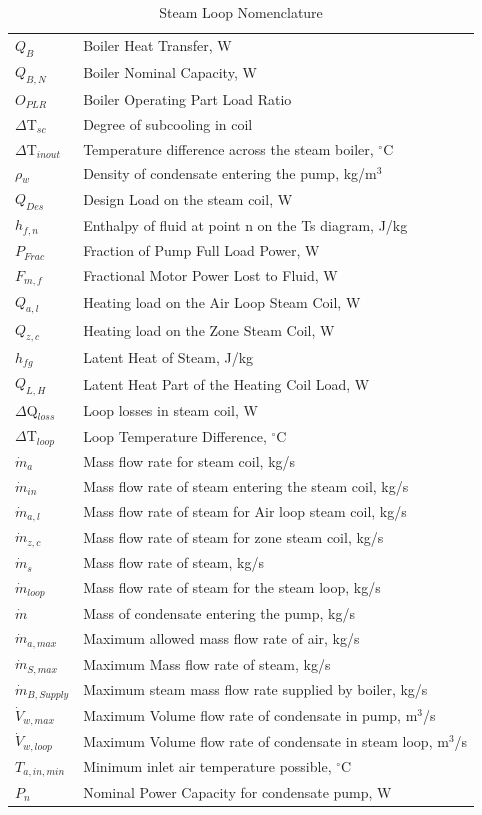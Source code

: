 \begin{longtable}[c]{p{1.0in}p{4.0in}}
\caption{Steam Loop Nomenclature \label{table:steam-loop-nomenclature}} \tabularnewline
\toprule
\endfirsthead

\caption[]{Steam Loop Nomenclature} \tabularnewline
\toprule
\endhead

\({Q_{B}}\) & Boiler Heat Transfer, W \tabularnewline
\({Q_{B,N}}\) & Boiler Nominal Capacity, W \tabularnewline
\({O_{PLR}}\) & Boiler Operating Part Load Ratio \tabularnewline
\(\Delta\)T\(_{sc}\) & Degree of subcooling in coil \tabularnewline
\(\Delta\)T\(_{inout}\) & Temperature difference across the steam boiler, \(^{\circ}\)C \tabularnewline
\(\rho\)\(_{w}\) & Density of condensate entering the pump, kg/m\(^3\) \tabularnewline
\(Q_{Des}\) & Design Load on the steam coil, W \tabularnewline
\(h_{f,n}\) & Enthalpy of fluid at point n on the Ts diagram, J/kg \tabularnewline
\(P_{Frac}\) & Fraction of Pump Full Load Power, W \tabularnewline
\(F_{m,f}\) & Fractional Motor Power Lost to Fluid, W \tabularnewline
\(Q_{a,l}\) & Heating load on the Air Loop Steam Coil, W \tabularnewline
\(Q_{z,c}\) & Heating load on the Zone Steam Coil, W \tabularnewline
\(h_{fg}\) & Latent Heat of Steam, J/kg \tabularnewline
\(Q_{L,H}\) & Latent Heat Part of the Heating Coil Load, W \tabularnewline
\(\Delta\)Q\(_{loss}\) & Loop losses in steam coil, W \tabularnewline
\(\Delta\)T\(_{loop}\) & Loop Temperature Difference, \(^{\circ}\)C \tabularnewline
\(\dot m_{a}\) & Mass flow rate for steam coil, kg/s \tabularnewline
\(\dot m_{in}\) & Mass flow rate of steam entering the steam coil, kg/s \tabularnewline
\(\dot m_{a,l}\) & Mass flow rate of steam for Air loop steam coil, kg/s \tabularnewline
\(\dot m_{z,c}\) & Mass flow rate of steam for zone steam coil, kg/s \tabularnewline
\(\dot m_{s}\) & Mass flow rate of steam, kg/s \tabularnewline
\(\dot m_{loop}\) & Mass flow rate of steam for the steam loop, kg/s \tabularnewline
\(\dot m\) & Mass of condensate entering the pump, kg/s \tabularnewline
\(\dot m_{a,max}\) & Maximum allowed mass flow rate of air, kg/s \tabularnewline
\(\dot m_{S,max}\) & Maximum Mass flow rate of steam, kg/s \tabularnewline
\(\dot m_{B,Supply}\) & Maximum steam mass flow rate supplied by boiler, kg/s \tabularnewline
\(\dot V_{w,max}\) & Maximum Volume flow rate of condensate in pump, m\(^3\)/s \tabularnewline
\(\dot V_{w,loop}\) & Maximum Volume flow rate of condensate in steam loop, m\(^3\)/s \tabularnewline
\(T_{a,in,min}\) & Minimum inlet air temperature possible, \(^{\circ}\)C \tabularnewline
\(P_{n}\) & Nominal Power Capacity for condensate pump, W \tabularnewline

\end{longtable}

